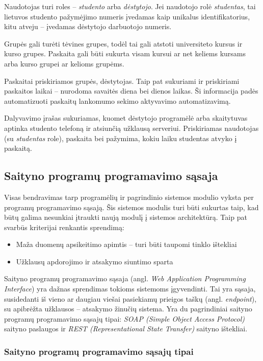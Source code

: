 \documentclass{VUMIFPSkursinis}
\begin{document}
Naudotojas turi roles – \textit{studento} arba \textit{dėstytojo}. Jei naudotojo rolė \textit{studentas}, tai lietuvos studento pažymėjimo numeris įvedamas kaip unikalus identifikatorius, kitu atveju – įvedamas dėstytojo darbuotojo numeris.

Grupės gali turėti tėvines grupes, todėl tai gali atstoti universiteto kursus ir kurso grupes. Paskaita gali būti sukurta visam kursui ar net keliems kursams arba kurso grupei ar kelioms grupėms.

Paskaitai priskiriamos grupės, dėstytojas. Taip pat sukuriami ir priskiriami paskaitos laikai – nurodoma savaitės diena bei dienos laikas. Ši informacija padės automatizuoti paskaitų lankomumo sekimo aktyvavimo automatizavimą.

Dalyvavimo įrašas sukuriamas, kuomet dėstytojo programėlė arba skaitytuvas aptinka studento telefoną ir atsiunčią užklausą serveriui. Priskiriamas naudotojas (su \textit{studentas} role), paskaita bei pažymima, kokiu laiku studentas atvyko į paskaitą.

\subsection{Saityno programų programavimo sąsaja} \label{webApi}

Visas bendravimas tarp programėlių ir pagrindinio sistemos modulio vyksta per programų programavimo sąsają. Šis sistemos modulis turi būti sukurtas taip, kad būtų galima nesunkiai įtraukti naują modulį į sistemos architektūrą. Taip pat svarbūs kriterijai renkantis sprendimą:

\begin{itemize}
	\item Maža duomenų apsikeitimo apimtis – turi būti taupomi tinklo ištekliai
	\item Užklausų apdorojimo ir atsakymo siuntimo sparta
\end{itemize}

Saityno programų programavimo sąsaja (angl. \textit{Web Application Programming Interface}) yra dažnas sprendimas tokioms sistemoms įgyvendinti. Tai yra sąsaja, susidedanti iš vieno ar daugiau viešai pasiekiamų prieigos taškų (angl. \textit{endpoint}), su apibrėžta užklausos – atsakymo žinučių sistema. Yra du pagrindiniai saityno programų programavimo sąsajų tipai: \textit{SOAP (Simple Object Access Protocol)} saityno paslaugos ir \textit{REST (Representational State Transfer)} saityno ištekliai.

\subsubsection{Saityno programų programavimo sąsajų tipai}
\end{document}
